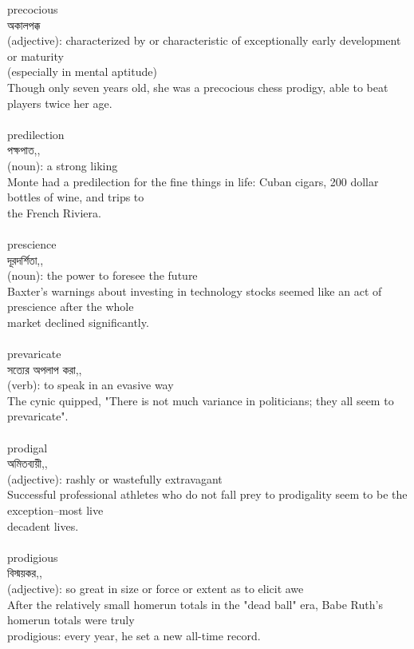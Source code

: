 \documentclass{article}
\begin{document}
{precocious}\\
{অকালপক্ক}\\
{(adjective): characterized by or characteristic of exceptionally early development or maturity\\(especially in mental aptitude)\\Though only seven years old, she was a precocious chess prodigy, able to beat players twice her age.\\}\\
{predilection}\\
{পক্ষপাত,,}\\
{(noun): a strong liking\\Monte had a predilection for the fine things in life: Cuban cigars, 200 dollar bottles of wine, and trips to\\the French Riviera.\\}\\
{prescience}\\
{দূরদর্শিতা,,}\\
{(noun): the power to foresee the future\\Baxter's warnings about investing in technology stocks seemed like an act of prescience after the whole\\market declined significantly.\\}\\
{prevaricate}\\
{সত্যের অপলাপ করা,,}\\
{(verb): to speak in an evasive way\\The cynic quipped, "There is not much variance in politicians; they all seem to prevaricate".\\}\\
{prodigal}\\
{অমিতব্যয়ী,,}\\
{(adjective): rashly or wastefully extravagant\\Successful professional athletes who do not fall prey to prodigality seem to be the exception--most live\\decadent lives.\\}\\
{prodigious}\\
{বিস্ময়কর,,}\\
{(adjective): so great in size or force or extent as to elicit awe\\After the relatively small homerun totals in the "dead ball" era, Babe Ruth's homerun totals were truly\\prodigious: every year, he set a new all-time record.\\}\\
\end{document}

